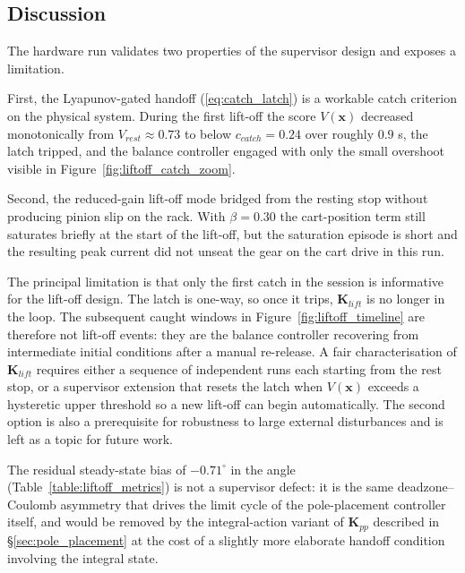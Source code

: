 \documentclass[11pt,a4paper]{article}
\begin{document}
\subsection{Discussion}

The hardware run validates two properties of the supervisor design and exposes a limitation.

First, the Lyapunov-gated handoff (\ref{eq:catch_latch}) is a workable catch criterion on the physical system. During the first lift-off the score $V(\mathbf{x})$ decreased monotonically from $V_{rest} \approx 0.73$ to below $c_{catch} = 0.24$ over roughly $0.9$ s, the latch tripped, and the balance controller engaged with only the small overshoot visible in Figure~\ref{fig:liftoff_catch_zoom}.

Second, the reduced-gain lift-off mode bridged from the resting stop without producing pinion slip on the rack. With $\beta = 0.30$ the cart-position term still saturates briefly at the start of the lift-off, but the saturation episode is short and the resulting peak current did not unseat the gear on the cart drive in this run.

The principal limitation is that only the first catch in the session is informative for the lift-off design. The latch is one-way, so once it trips, $\mathbf{K}_{lift}$ is no longer in the loop. The subsequent caught windows in Figure~\ref{fig:liftoff_timeline} are therefore not lift-off events: they are the balance controller recovering from intermediate initial conditions after a manual re-release. A fair characterisation of $\mathbf{K}_{lift}$ requires either a sequence of independent runs each starting from the rest stop, or a supervisor extension that resets the latch when $V(\mathbf{x})$ exceeds a hysteretic upper threshold so a new lift-off can begin automatically. The second option is also a prerequisite for robustness to large external disturbances and is left as a topic for future work.

The residual steady-state bias of $-0.71^\circ$ in the angle (Table~\ref{table:liftoff_metrics}) is not a supervisor defect: it is the same deadzone--Coulomb asymmetry that drives the limit cycle of the pole-placement controller itself, and would be removed by the integral-action variant of $\mathbf{K}_{pp}$ described in \S\ref{sec:pole_placement} at the cost of a slightly more elaborate handoff condition involving the integral state.
\end{document}
